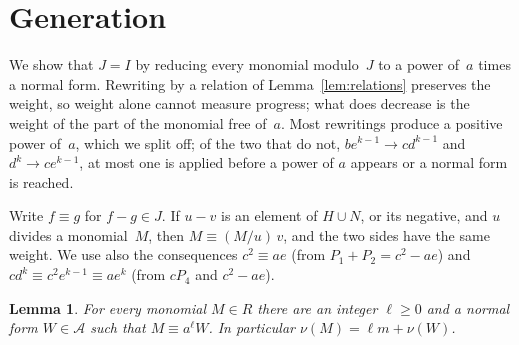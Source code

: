 \documentclass[11pt,letterpaper]{article}
\numberwithin{equation}{section}
\theoremstyle{plain}
\newtheorem{lemma}[theorem]{Lemma}
\theoremstyle{remark}
\newcommand{\NF}{\mathcal{A}}
\begin{document}
\section{Generation}\label{sec:generation}

We show that $J=I$ by reducing every monomial modulo~$J$ to a power of~$a$ times a normal form. Rewriting by a relation of Lemma~\ref{lem:relations} preserves the weight, so weight alone cannot measure progress; what does decrease is the weight of the part of the monomial free of~$a$. Most rewritings produce a positive power of~$a$, which we split off; of the two that do not, $be^{k-1}\to cd^{k-1}$ and $d^k\to ce^{k-1}$, at most one is applied before a power of $a$ appears or a normal form is reached.

Write $f\equiv g$ for $f-g\in J$. If $u-v$ is an element of $H\cup N$, or its negative, and $u$ divides a monomial~$M$, then $M\equiv (M/u)\,v$, and the two sides have the same weight. We use also the consequences $c^2\equiv ae$ (from $P_1+P_2=c^2-ae$) and $cd^k\equiv c^2e^{k-1}\equiv ae^k$ (from $cP_4$ and $c^2-ae$).

\begin{lemma}\label{lem:reduction}
For every monomial $M\in R$ there are an integer $\ell\ge 0$ and a normal form $W\in\NF$ such that $M\equiv a^{\ell}W$. In particular $\nu(M)=\ell m+\nu(W)$.
\end{lemma}
\end{document}

